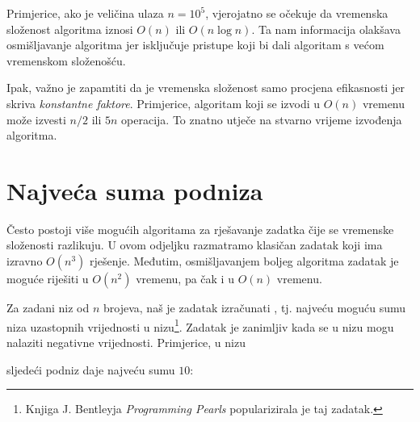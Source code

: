 Primjerice, ako je veličina ulaza $n=10^5$,
vjerojatno se očekuje da vremenska
složenost algoritma iznosi $O(n)$ ili $O(n \log n)$.
Ta nam informacija olakšava osmišljavanje algoritma
jer isključuje pristupe koji bi dali
algoritam s većom vremenskom složenošću.


Ipak, važno je zapamtiti da je
vremenska složenost samo procjena efikasnosti
jer skriva \emph{konstantne faktore}.
Primjerice, algoritam koji se izvodi u $O(n)$ vremenu
može izvesti $n/2$ ili $5n$ operacija.
To znatno utječe na stvarno
vrijeme izvođenja algoritma.

\section{Najveća suma podniza}


Često postoji više mogućih algoritama
za rješavanje zadatka čije se
vremenske složenosti razlikuju.
U ovom odjeljku razmatramo klasičan zadatak koji
ima izravno $O(n^3)$ rješenje.
Međutim, osmišljavanjem boljeg algoritma
zadatak je moguće riješiti u $O(n^2)$
vremenu, pa čak i u $O(n)$ vremenu.

Za zadani niz od $n$ brojeva,
naš je zadatak izračunati
, tj.
najveću moguću sumu
niza uzastopnih vrijednosti
u nizu\footnote{Knjiga J. Bentleyja
\emph{Programming Pearls} \cite{ben86} popularizirala je taj zadatak.}.
Zadatak je zanimljiv kada se u nizu mogu nalaziti
negativne vrijednosti.
Primjerice, u nizu
\begin{center}
\end{center}
\begin{samepage}
sljedeći podniz daje najveću sumu $10$:
\begin{center}
\end{center}
\end{samepage}

